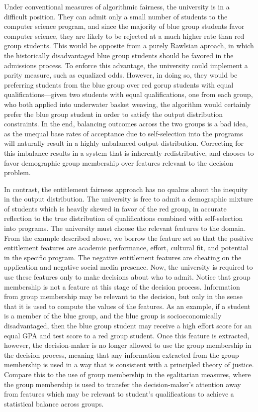 Under conventional measures of algorithmic fairness, the university is in a 
difficult position. They can admit only a small number of students to the 
computer science program, and since the majority of blue group students favor 
computer science, they are likely to be rejected at a much higher rate than red
group students. This would be opposite from a purely Rawlsian aproach, in which
the historically disadvantaged blue group students should be favored in the 
admissions process. To enforce this advantage, the university could implement a
parity measure, such as equalized odds. However, in doing so, they would be
preferring students from the blue group over red gorup students with equal
qualifications—given two students with equal qualifications, one from each
group, who both applied into underwater basket weaving, the algorithm would
certainly prefer the blue group student in order to satisfy the output
distribution constraints. In the end, balancing outcomes across the two groups
is a bad idea, as the unequal base rates of acceptance due to self-selection 
into the programs will naturally result in a highly unbalanced output
distribution. Correcting for this imbalance results in a system that is
inherently redistributive, and chooses to favor demographic group membership 
over features relevant to the decision problem.

In contrast, the entitlement fairness approach has no qualms about the inequity
in the output distribution. The university is free to admit a demographic 
mixture of students which is heavily skewed in favor of the red group, in 
accurate reflection to the true distribution of qualifications combined with 
self-selection into programs. The university must choose the relevant features
to the domain. From the example described above, we borrow the feature set so
that the positive entitlement features are academic performance, effort,
cultural fit, and potential in the specific program. The negative entitlement 
features are cheating on the application and negative social media presence.
Now, the university is required to use these features only to make decisions
about who to admit. Notice that group membership is not a feature at this stage
of the decision process. Information from group membership may be relevant to
the decision, but only in the sense that it is used to compute the values of the
features. As an example, if a student is a member of the blue group, and the 
blue group is socioeconomically disadvantaged, then the blue group student may
receive a high effort score for an equal GPA and test score to a red group
student. Once this feature is extracted, however, the decision-maker is no 
longer allowed to use the group membership in the decision process, meaning that
any information extracted from the group membership is used in a way that is
consistent with a principled theory of justice. Compare this to the use of group
membership in the egalitarian measures, where the group membership is used to 
transfer the decision-maker's attention away from features which may be relevant
to student's qualifications to achieve a statistical balance across groups.

